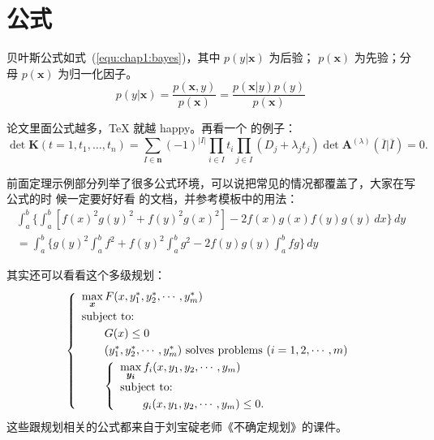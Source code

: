 \section{公式}
\label{sec:equation}
贝叶斯公式如式~(\ref{equ:chap1:bayes})，其中 $p(y|\mathbf{x})$ 为后验；
$p(\mathbf{x})$ 为先验；分母 $p(\mathbf{x})$ 为归一化因子。
\begin{equation}
\label{equ:chap1:bayes}
p(y|\mathbf{x}) = \frac{p(\mathbf{x},y)}{p(\mathbf{x})}=
\frac{p(\mathbf{x}|y)p(y)}{p(\mathbf{x})} 
\end{equation}

论文里面公式越多，\TeX{} 就越 happy。再看一个  的例子：
\newcommand{\envert}[1]{\left\lvert#1\right\rvert} 
\begin{equation}\label{detK2}
\det\mathbf{K}(t=1,t_1,\dots,t_n)=\sum_{I\in\mathbf{n}}(-1)^{\envert{I}}
\prod_{i\in I}t_i\prod_{j\in I}(D_j+\lambda_jt_j)\det\mathbf{A}
^{(\lambda)}(\overline{I}|\overline{I})=0.
\end{equation} 

前面定理示例部分列举了很多公式环境，可以说把常见的情况都覆盖了，大家在写公式的时
候一定要好好看  的文档，并参考模板中的用法：
\begin{multline*}%
\int_a^b\biggl\{\int_a^b[f(x)^2g(y)^2+f(y)^2g(x)^2]
 -2f(x)g(x)f(y)g(y)\,dx\biggr\}\,dy \\
 =\int_a^b\biggl\{g(y)^2\int_a^bf^2+f(y)^2
  \int_a^b g^2-2f(y)g(y)\int_a^b fg\biggr\}\,dy
\end{multline*}

其实还可以看看这个多级规划：
\begin{equation}\label{bilevel}
\left\{\begin{array}{l}
\max\limits_{{\mbox{\footnotesize\boldmath $x$}}} F(x,y_1^*,y_2^*,\cdots,y_m^*)\\[0.2cm]
\mbox{subject to:}\\[0.1cm]
\qquad G(x)\le 0\\[0.1cm]
\qquad(y_1^*,y_2^*,\cdots,y_m^*)\mbox{ solves problems }(i=1,2,\cdots,m)\\[0.1cm]
\qquad\left\{\begin{array}{l}
    \max\limits_{{\mbox{\footnotesize\boldmath $y_i$}}}f_i(x,y_1,y_2,\cdots,y_m)\\[0.2cm]
    \mbox{subject to:}\\[0.1cm]
    \qquad g_i(x,y_1,y_2,\cdots,y_m)\le 0.
    \end{array}\right.
\end{array}\right.
\end{equation}
这些跟规划相关的公式都来自于刘宝碇老师《不确定规划》的课件。
